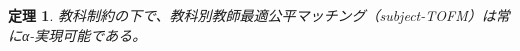 \documentclass[12pt, a4paper]{article}
\theoremstyle{definition}
\theoremstyle{remark}
\theoremstyle{plain}
\newtheorem{theorem}{定理}
\begin{document}


  
\begin{theorem}
教科制約の下で、教科別教師最適公平マッチング（subject-TOFM）は常にα-実現可能である。
\end{theorem}
\end{document}
